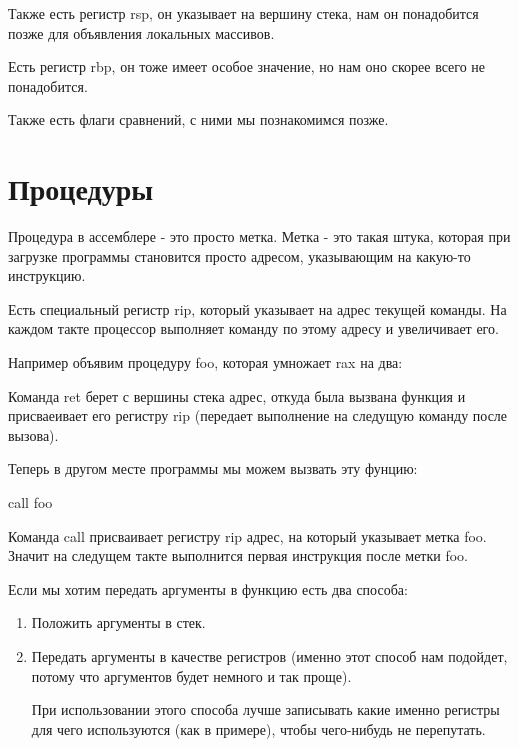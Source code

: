 \documentclass[a4paper,12pt]{article}
\begin{document}
Также есть регистр rsp, он указывает на вершину стека, нам он
понадобится позже для объявления локальных массивов.

Есть регистр rbp, он тоже имеет особое значение, но нам оно скорее
всего не понадобится.

Также есть флаги сравнений, с ними мы познакомимся позже.

\section{Процедуры}

Процедура в ассемблере - это просто метка. Метка - это такая штука,
которая при загрузке программы становится просто адресом, указывающим
на какую-то инструкцию.

Есть специальный регистр rip, который указывает на адрес текущей
команды. На каждом такте процессор выполняет команду по этому адресу и
увеличивает его.

Например объявим процедуру foo, которая умножает rax на два:



Команда ret берет с вершины стека адрес, откуда была вызвана функция и
присваеивает его регистру rip (передает выполнение на следущую команду
после вызова).

Теперь в другом месте программы мы можем вызвать эту фунцию:

call foo            

Команда call присваивает регистру rip адрес, на который указывает
метка foo. Значит на следущем такте выполнится первая инструкция после
метки foo.

Если мы хотим передать аргументы в функцию есть два способа:

\begin{enumerate}
  \item Положить аргументы в стек.

    
      
  \item Передать аргументы в качестве регистров (именно этот способ
    нам подойдет, потому что аргументов будет немного и так проще).

    
          
    При использовании этого способа лучше записывать какие именно
    регистры для чего используются (как в примере), чтобы чего-нибудь
    не перепутать.

\end{enumerate}
\end{document}
